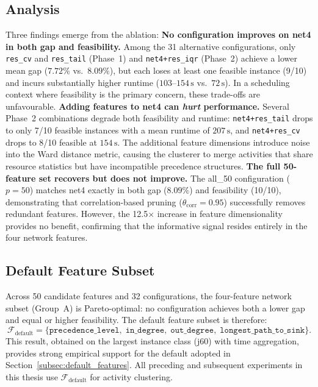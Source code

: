 \subsection{Analysis}
\label{subsec:ablation_analysis}
Three findings emerge from the ablation:
\textbf{No configuration improves on net4 in both gap and
feasibility.}
Among the 31 alternative configurations, only
\texttt{res\_cv} and \texttt{res\_tail} (Phase~1) and
\texttt{net4+res\_iqr} (Phase~2) achieve a lower mean gap
($7.72\%$ vs.\ $8.09\%$), but each loses at least one
feasible instance (9/10) and incurs substantially higher
runtime ($103$--$154\,\text{s}$ vs.\ $72\,\text{s}$).
In a scheduling context where feasibility is the primary
concern, these trade-offs are unfavourable.
\textbf{Adding features to net4 can \emph{hurt} performance.}
Several Phase~2 combinations degrade both feasibility and
runtime: \texttt{net4+res\_tail} drops to only 7/10 feasible
instances with a mean runtime of $207\,\text{s}$, and
\texttt{net4+res\_cv} drops to 8/10 feasible at $154\,\text{s}$.
The additional feature dimensions introduce noise into the
Ward distance metric, causing the clusterer to merge
activities that share resource statistics but have
incompatible precedence structures.
\textbf{The full 50-feature set recovers but does not improve.}
The all\_50 configuration ($p=50$) matches net4 exactly
in both gap ($8.09\%$) and feasibility (10/10), demonstrating
that correlation-based pruning ($\theta_{\mathrm{corr}}=0.95$)
successfully removes redundant features. However, the
12.5$\times$ increase in feature dimensionality provides no
benefit, confirming that the informative signal resides
entirely in the four network features.
\subsection{Default Feature Subset}
\label{subsec:ablation_default}
Across 50 candidate features and 32 configurations, the
four-feature network subset (Group~A) is Pareto-optimal: no
configuration achieves both a lower gap and equal or higher
feasibility. The default feature subset is therefore:
\begin{equation}
  \mathcal{F}_{\text{default}}
  = \{\texttt{precedence\_level},\;
      \texttt{in\_degree},\;
      \texttt{out\_degree},\;
      \texttt{longest\_path\_to\_sink}\}.
  \label{eq:default_features_exp}
\end{equation}
This result, obtained on the largest instance class (j60) with
time aggregation, provides strong empirical support for the
default adopted in Section~\ref{subsec:default_features}. All
preceding and subsequent experiments in this thesis use
$\mathcal{F}_{\text{default}}$ for activity clustering.
